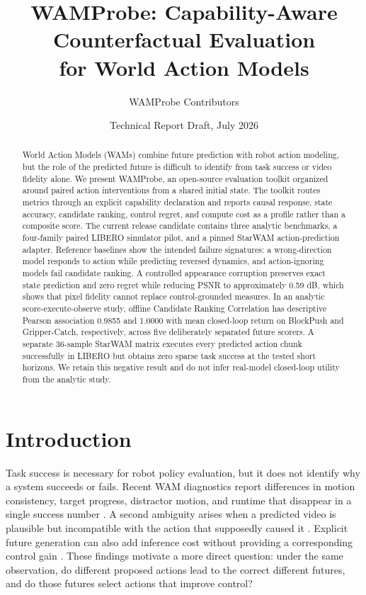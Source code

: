 \documentclass[10pt]{article}
\title{WAMProbe: Capability-Aware Counterfactual Evaluation\\for World Action Models}
\author{WAMProbe Contributors}
\date{Technical Report Draft, July 2026}
\begin{document}
\maketitle

\begin{abstract}
World Action Models (WAMs) combine future prediction with robot action modeling, but the
role of the predicted future is difficult to identify from task success or video fidelity
alone. We present WAMProbe, an open-source evaluation toolkit organized around paired
action interventions from a shared initial state. The toolkit routes metrics through an
explicit capability declaration and reports causal response, state accuracy, candidate
ranking, control regret, and compute cost as a profile rather than a composite score.
The current release candidate contains three analytic benchmarks, a four-family paired LIBERO
simulator pilot, and a pinned StarWAM action-prediction adapter. Reference baselines show
the intended failure signatures: a wrong-direction model responds to action while
predicting reversed dynamics, and action-ignoring models fail candidate ranking. A
controlled appearance corruption preserves exact state prediction and zero regret while
reducing PSNR to approximately 0.59 dB, which shows that pixel fidelity cannot replace
control-grounded measures. In an analytic score-execute-observe study, offline Candidate
Ranking Correlation has descriptive Pearson association 0.9855 and 1.0000 with mean
closed-loop return on BlockPush and Gripper-Catch, respectively, across five deliberately
separated future scorers. A separate 36-sample StarWAM matrix executes every predicted
action chunk successfully in LIBERO but obtains zero sparse task success at the tested
short horizons. We retain this negative result and do not infer real-model closed-loop
utility from the analytic study.
\end{abstract}

\section{Introduction}

Task success is necessary for robot policy evaluation, but it does not identify why a
system succeeds or fails. Recent WAM diagnostics report differences in motion
consistency, target progress, distractor motion, and runtime that disappear in a single
success number \cite{mai2026beyond}. A second ambiguity arises when a predicted video is
plausible but incompatible with the action that supposedly caused it
\cite{ruan2026compatible}. Explicit future generation can also add inference cost without
providing a corresponding control gain \cite{yuan2026fastwam}. These findings motivate a
more direct question: under the same observation, do different proposed actions lead to
the correct different futures, and do those futures select actions that improve control?
\end{document}

